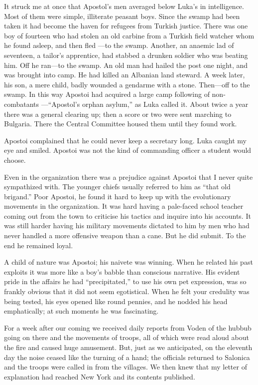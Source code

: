 \documentclass[a5paper,12pt]{book}
\begin{document}
It struck me at once that Apostol's men averaged below Luka's in intelligence. Most of them were simple, illiterate peasant boys. Since the swamp had been taken it had become the haven for refugees from Turkish justice. There was one boy of fourteen who had stolen an old carbine from a Turkish field watcher whom he found asleep, and then fled —to the swamp. Another, an anaemic lad of seventeen, a tailor's apprentice, had stabbed a drunken soldier who was beating him. Off he ran—to the swamp. An old man had hailed the post one night, and was brought into camp. He had killed an Albanian land steward. A week later, his son, a mere child, badly wounded a gendarme with a stone. Then—off to the swamp. In this way Apostoi had acquired a large camp following of non-combatants —“Apostol’s orphan asylum,” as Luka called it. About twice a year there was a general clearing up; then a score or two were sent marching to Bulgaria. There the Central Committee housed them until they found work. 

Apostoi complained that he could never keep a secretary long. Luka caught my eye and smiled. Apostoi was not the kind of commanding officer a student would choose. 

Even in the organization there was a prejudice against Apostoi that I never quite sympathized with. The younger chiefs usually referred to him as “that old brigand.” Poor Apostoi, he found it hard to keep up with the evolutionary movements in the organization. It was hard having a pale-faced school teacher coming out from the town to criticise his tactics and inquire into his accounts. It was still harder having his military movements dictated to him by men who had never handled a more offensive weapon than a cane. But he did submit. To the end he remained loyal. 

A child of nature was Apostoi; his naivete was winning. When he related his past exploits it was more like a boy’s babble than conscious narrative. His evident pride in the affairs he had “precipitated,” to use his own pet expression, was so frankly obvious that it did not seem egotistical. When he felt your credulity was being tested, his eyes opened like round pennies, and he nodded his head emphatically; at such moments he was fascinating. 

For a week after our coming we received daily reports from Voden of the hubbub going on there and the movements of troops, all of which were read aloud about the fire and caused huge amusement. But, just as we anticipated, on the eleventh day the noise ceased like the turning of a hand; the officials returned to Salonica and the troops were called in from the villages. We then knew that my letter of explanation had reached New York and its contents published. 
\end{document}

